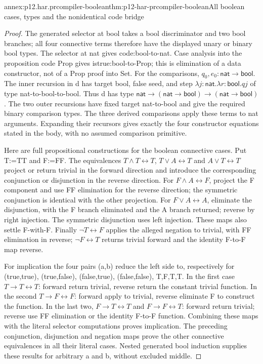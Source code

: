 \begin{annexitem}{annex:p12.har.prcompiler-boolean}{thm:p12-har-prcompiler-boolean}{All boolean cases, types and the nonidentical code bridge}
\begin{proof}
The generated selector at bool takes a bool discriminator and two bool
branches; all four connective terms therefore have the displayed unary
or binary bool types. The selector at nat gives code:bool-to-nat.
Case analysis into the proposition code Prop gives istrue:bool-to-Prop;
this is elimination of a data constructor, not of a Prop proof into Set.
For the comparisons, \(q_0,e_0:\mathsf{nat}\to\mathsf{bool}\).
The inner recursion in d has target bool, false seed, and step
\(\lambda j:\mathsf{nat}.\lambda r:\mathsf{bool}.q j\) of
type nat-to-bool-to-bool. Thus d has type
\(\mathsf{nat}\to(\mathsf{nat}\to\mathsf{bool})\to
(\mathsf{nat}\to\mathsf{bool})\). The two outer recursions
have fixed target nat-to-bool and give the required binary comparison
types. The three derived comparisons apply these terms to nat arguments.
Expanding their recursors gives exactly the four constructor equations
stated in the body, with no assumed comparison primitive.

Here are full propositional constructions for the boolean connective
cases. Put T:=TT and F:=FF. The equivalences
\(T\wedge T\leftrightarrow T\), \(T\vee A\leftrightarrow T\)
and \(A\vee T\leftrightarrow T\) project or return trivial in the
forward direction and introduce the corresponding conjunction or
disjunction in the reverse direction. For
\(F\wedge A\leftrightarrow F\), project the F component and use
FF elimination for the reverse direction; the symmetric conjunction
is identical with the other projection. For
\(F\vee A\leftrightarrow A\), eliminate the disjunction, with
the F branch eliminated and the A branch returned; reverse by right
injection. The symmetric disjunction uses left injection. These maps
also settle F-with-F. Finally
\(\neg T\leftrightarrow F\) applies the alleged negation to
trivial, with FF elimination in reverse; \(\neg F\leftrightarrow T\)
returns trivial forward and the identity F-to-F map reverse.

For implication the four pairs (a,b) reduce the left side to,
respectively for (true,true), (true,false), (false,true), (false,false),
T,F,T,T. In the first case \(T\to T\leftrightarrow T\): forward
return trivial, reverse return the constant trivial function. In the
second \(T\to F\leftrightarrow F\): forward apply to trivial,
reverse eliminate F to construct the function. In the last two,
\(F\to T\leftrightarrow T\) and \(F\to F\leftrightarrow T\):
forward return trivial; reverse use FF elimination or the identity
F-to-F function. Combining these maps with the literal selector
computations proves implication. The preceding conjunction,
disjunction and negation maps prove the other connective equivalences
in all their literal cases. Nested generated bool induction supplies
these results for arbitrary a and b, without excluded middle.


\end{proof}
\end{annexitem}

